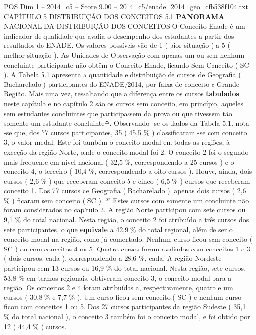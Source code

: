 \begin{textsample}{POS Dim 1 – 2014\_c5 – Score 9.00 – 2014\_c5/enade\_2014\_geo\_cfb538f104.txt}  \label{ex:f1_pos_108}
CAPÍTULO 5 DISTRIBUIÇÃO DOS CONCEITOS 5.1 \textbf{PANORAMA} NACIONAL DA DISTRIBUIÇÃO DOS CONCEITOS O Conceito Enade é um indicador de qualidade que avalia o desempenho dos estudantes a partir dos resultados do ENADE.
Os valores possíveis vão de 1 ( pior situação ) a 5 ( melhor situação ).
As Unidades de Observação com apenas um ou sem nenhum concluinte participante não obtêm o Conceito Enade, ficando Sem Conceito ( SC ).
A Tabela 5.1 apresenta a quantidade e distribuição de cursos de Geografia ( Bacharelado ) participantes do ENADE/2014, por faixa de conceito e Grande Região.
Mais uma vez, ressaltando que a diferença entre os cursos \textbf{tabulados} neste capítulo e no capítulo 2 são os cursos sem conceito, em princípio, aqueles sem estudantes concluintes que participassem da prova ou que tivessem tão somente um estudante concluinte²².
Observando -se os dados da Tabela 5.1, nota -se que, dos 77 cursos participantes, 35 ( 45,5 \% ) classificaram -se com conceito 3, o valor modal.
Este foi também o conceito modal em todas as regiões, à exceção da região Norte, onde o conceito modal foi 2.
O conceito 2 foi o segundo mais frequente em nível nacional ( 32,5 \%, correspondendo a 25 cursos ) e o conceito 4, o terceiro ( 10,4 \%, correspondendo a oito cursos ).
Houve, ainda, dois cursos ( 2,6 \% ) que receberam conceito 5 e cinco ( 6,5 \% ) cursos que receberam conceito 1.
Dos 77 cursos de Geografia ( Bacharelado ), apenas dois cursos ( 2,6 \% ) ficaram sem conceito ( SC ). ²² Estes cursos com somente um concluinte não foram considerados no capítulo 2.
A região Norte participou com sete cursos ou 9,1 \% do total nacional.
Nesta região, o conceito 2 foi atribuído a três cursos dos sete participantes, o que \textbf{equivale} a 42,9 \% do total regional, além de ser o conceito modal na região, como já comentado.
Nenhum curso ficou sem conceito ( SC ) ou com conceitos 4 ou 5.
Quatro cursos foram avaliados com conceitos 1 e 3 ( dois cursos, cada ), correspondendo a 28,6 \%, cada.
A região Nordeste participou com 13 cursos ou 16,9 \% do total nacional.
Nesta região, sete cursos, 53,8 \% em termos regionais, obtiveram conceito 3, o conceito modal para a região.
Os conceitos 2 e 4 foram atribuídos a, respectivamente, quatro e um cursos ( 30,8 \% e 7,7 \% ).
Um curso ficou sem conceito ( SC ) e nenhum curso ficou com conceitos 1 ou 5.
Dos 27 cursos participantes da região Sudeste ( 35,1 \% do total nacional ), o conceito 3 também foi o conceito modal, e foi obtido por 12 ( 44,4 \% ) cursos.

\end{textsample}
